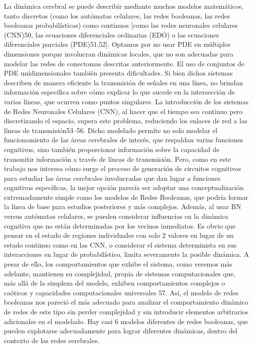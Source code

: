 La dinámica cerebral se puede describir mediante muchos modelos matemáticos, tanto discretos (como los autómatas celulares, las redes booleanas, las redes booleanas probabilísticas) como continuos [como las redes neuronales celulares (CNN)50, las ecuaciones diferenciales ordinarias (EDO) o las ecuaciones diferenciales parciales (PDE)51,52]. Optamos por no usar PDE en múltiples dimensiones porque involucran dinámicas locales, que no son adecuadas para modelar las redes de conectomas descritas anteriormente. El uso de conjuntos de PDE unidimensionales también presenta dificultades. Si bien dichos sistemas describen de manera eficiente la transmisión de señales en una línea, no brindan información específica sobre cómo explicar lo que sucede en la intersección de varias líneas, que ocurren como puntos singulares. La introducción de los sistemas de Redes Neuronales Celulares (CNN), al hacer que el tiempo sea continuo pero discretizando el espacio, supera este problema, reduciendo los enlaces de red a las líneas de transmisión53–56. Dicho modelado permite no solo modelar el funcionamiento de las áreas cerebrales de interés, que respaldan varias funciones cognitivas, sino también proporcionar información sobre la capacidad de transmitir información a través de líneas de transmisión. Pero, como en este trabajo nos interesa cómo surge el proceso de generación de circuitos cognitivos para estudiar las áreas cerebrales involucradas que dan lugar a funciones cognitivas específicas, la mejor opción parecía ser adoptar una conceptualización extremadamente simple como los modelos de Redes Booleanas, que podría formar la línea de base para estudios posteriores y más complejos. Además, al usar BN versus autómatas celulares, se pueden considerar influencias en la dinámica cognitiva que no están determinadas por los vecinos inmediatos. Es obvio que pensar en el estado de regiones individuales con solo 2 valores en lugar de un estado continuo como en las CNN, o considerar el sistema determinista en sus interacciones en lugar de probabilístico, limita severamente la posible dinámica. A pesar de ello, los comportamientos que exhibe el sistema, como veremos más adelante, mantienen su complejidad, propia de sistemas computacionales que, más allá de la simpleza del modelo, exhiben comportamientos complejos o caóticos y capacidades computacionales universales 57. Así, el modelo de redes booleanas nos pareció el más adecuado para analizar el comportamiento dinámico de redes de este tipo sin perder complejidad y sin introducir elementos arbitrarios adicionales en el modelado. Hay casi 6 modelos diferentes de redes booleanas, que pueden explotarse adecuadamente para lograr diferentes dinámicas, dentro del contexto de las redes cerebrales.

